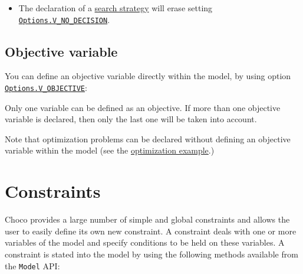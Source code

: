\begin{note}
  \begin{itemize}
  \item The declaration of a \hyperlink{solver:searchstrategy}{search strategy} will erase setting \hyperlink{vnodecision:vnodecisionoptions}{\tt Options.V\_NO\_DECISION}.
  \end{itemize}
\end{note}

\subsection{Objective variable}\label{model:objectivevariable}\hypertarget{model:objectivevariable}{}
You can define an objective variable directly within the model, by using option \hyperlink{vobjective:vobjectiveoptions}{\tt Options.V\_OBJECTIVE}:


Only one variable can be defined as an objective. If more than one objective variable is declared, then only the last one will be taken into account.

Note that optimization problems can be declared without defining an objective variable within the model (see the \hyperlink{solver:optimization}{optimization example}.)


\section{Constraints}\label{model:constraints}\hypertarget{model:constraints}{}
Choco provides a large number of simple and global constraints and allows the user to easily define its own new constraint.
A constraint deals with one or more variables of the model and specify conditions to be held on these variables. 
A constraint is stated into the model by using the following methods available from the \texttt{Model} API: 

